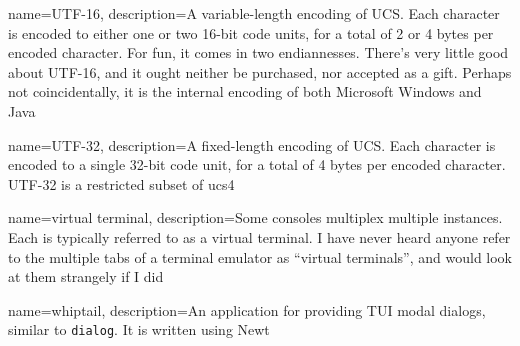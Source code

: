 {
  name={UTF-16},
description={A variable-length encoding of UCS. Each character is encoded to
  either one or two 16-bit code units, for a total of 2 or 4 bytes per
  encoded character. For fun, it comes in two endiannesses. There's very little
  good about UTF-16, and it ought neither be purchased, nor accepted as a gift.
  Perhaps not coincidentally, it is the internal encoding of both Microsoft
  Windows and Java}
}

{
  name={UTF-32},
description={A fixed-length encoding of UCS. Each character is encoded to a
  single 32-bit code unit, for a total of 4 bytes per encoded character. UTF-32
  is a restricted subset of \Gls{ucs4}\cite{rfc3629}}
}

{
  name={virtual terminal},
description={Some consoles multiplex multiple instances. Each is
  typically referred to as a virtual terminal. I have never heard anyone
  refer to the multiple tabs of a terminal emulator as ``virtual terminals'',
  and would look at them strangely if I did}
}

{
  name={whiptail},
description={An application for providing TUI modal dialogs, similar to \texttt{dialog}. It is written using Newt}
}

